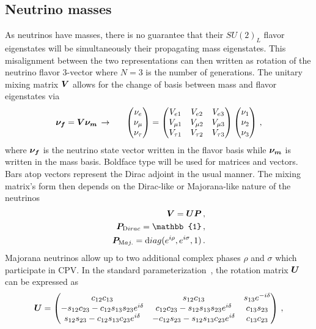 \subsection{Neutrino masses}\label{sec:mix}
\noindent As neutrinos have masses, there is no guarantee that their $SU(2)_{L}$ flavor eigenstates will be simultaneously their propagating mass eigenstates. This misalignment between the two representations can then written as rotation of the neutrino flavor 3-vector where $N=3$ is the number of generations. The unitary mixing matrix $\boldsymbol{V}$ allows for the change of basis between mass and flavor eigenstates via
\begin{alignat}{1}
	\label{basis:1} \bb{\nu_{f}}=\bb{V}\bb{\nu_{m}}\,\rightarrow\indent
	\begin{pmatrix}
		\nu_{e}\\
		\nu_{\mu}\\
		\nu_{\tau}
	\end{pmatrix}=
	\begin{pmatrix}
		V_{e1} & V_{e2} & V_{e3}\\
		V_{\mu1} & V_{\mu2} & V_{\mu3}\\
		V_{\tau1} & V_{\tau2} & V_{\tau3}
	\end{pmatrix}
	\begin{pmatrix}
		\nu_{1}\\
		\nu_{2}\\
		\nu_{3}
	\end{pmatrix}\,,
\end{alignat}
where $\boldsymbol{\nu_{f}}$ is the neutrino state vector written in the flavor basis while $\boldsymbol{\nu_{m}}$ is written in the mass basis. Boldface type will be used for matrices and vectors. Bars atop vectors represent the Dirac adjoint in the usual manner. The mixing matrix's form then depends on the Dirac-like or Majorana-like nature of the neutrinos
\begin{align}
	\label{phases:1} \bb{V} = \bb{U}\bb{P}\,,\\
	\label{phases:2} \bb{P}_{\mathrm Dirac} = \mathbb{1}\,,\\
	\label{phases:3} \bb{P}_{\mathrm Maj.} = {\mathrm diag}(e^{i\rho},e^{i\sigma},1)\,.
\end{align}
Majorana neutrinos allow up to two additional complex phases $\rho$ and $\sigma$ which participate in CPV. In the standard parameterization~\citep{schwartz2014quantum}, the rotation matrix $\boldsymbol{U}$ can be expressed as
\begin{alignat}{1}
	\label{rotation:1} \boldsymbol{U} =
	  \begin{pmatrix}
		  c_{12}c_{13} & s_{12}c_{13} & s_{13}e^{-i\delta}\\
		  -s_{12}c_{23} - c_{12}s_{13}s_{23}e^{i\delta} & c_{12}c_{23} - s_{12}s_{13}s_{23}e^{i\delta} & c_{13}s_{23}\\
		  s_{12}s_{23} - c_{12}s_{13}c_{23}e^{i\delta}& -c_{12}s_{23} - s_{12}s_{13}c_{23}e^{i\delta} & c_{13}c_{23}
	  \end{pmatrix}\,,
\end{alignat}
